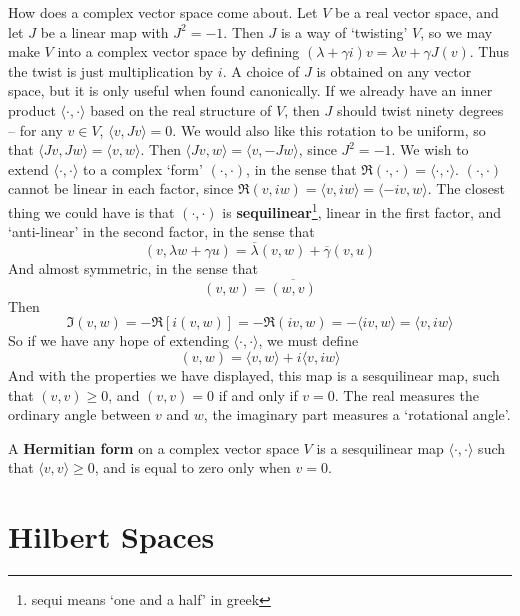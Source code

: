 How does a complex vector space come about. Let $V$ be a real vector space, and let $J$ be a linear map with $J^2 = -1$. Then $J$ is a way of `twisting' $V$, so we may make $V$ into a complex vector space by defining $(\lambda + \gamma i) v = \lambda v + \gamma J(v)$. Thus the twist is just multiplication by $i$. A choice of $J$ is obtained on any vector space, but it is only useful when found canonically. If we already have an inner product $\langle \cdot, \cdot \rangle$ based on the real structure of $V$, then $J$ should twist ninety degrees --  for any $v \in V$, $\langle v, Jv \rangle = 0$. We would also like this rotation to be uniform, so that $\langle Jv, Jw \rangle = \langle v, w \rangle$. Then $\langle Jv, w \rangle = \langle v, -Jw \rangle$, since $J^2 = -1$. We wish to extend $\langle \cdot, \cdot \rangle$ to a complex `form' $(\cdot, \cdot)$, in the sense that $\Re (\cdot, \cdot) = \langle \cdot, \cdot \rangle$. $(\cdot, \cdot)$ cannot be linear in each factor, since $\Re (v, iw) = \langle v, iw \rangle = \langle -iv, w \rangle$. The closest thing we could have is that $(\cdot, \cdot)$ is {\bf sequilinear}\footnote{sequi means `one and a half' in greek}, linear in the first factor, and `anti-linear' in the second factor, in the sense that
%
\[ (v, \lambda w + \gamma u) = \overline{\lambda} (v,w) + \overline{\gamma} (v,u) \]
%
And almost symmetric, in the sense that
%
\[ (v,w) = \overline{(w,v)} \]
%
Then
%
\[ \Im (v,w) = - \Re [i (v, w)] = - \Re (iv, w) = - \langle iv, w \rangle = \langle v, i w \rangle \]
%
So if we have any hope of extending $\langle \cdot, \cdot \rangle$, we must define
%
\[ (v,w) = \langle v, w \rangle + i \langle v, iw \rangle \]
%
And with the properties we have displayed, this map is a sesquilinear map, such that $(v,v) \geq 0$, and $(v,v) = 0$ if and only if $v = 0$. The real measures the ordinary angle between $v$ and $w$, the imaginary part measures a `rotational angle'.

\begin{definition}
    A {\bf Hermitian form} on a complex vector space $V$ is a sesquilinear map $\langle \cdot, \cdot \rangle$ such that $\langle v, v \rangle \geq 0$, and is equal to zero only when $v = 0$.
    
\end{definition}


\chapter{Hilbert Spaces}

